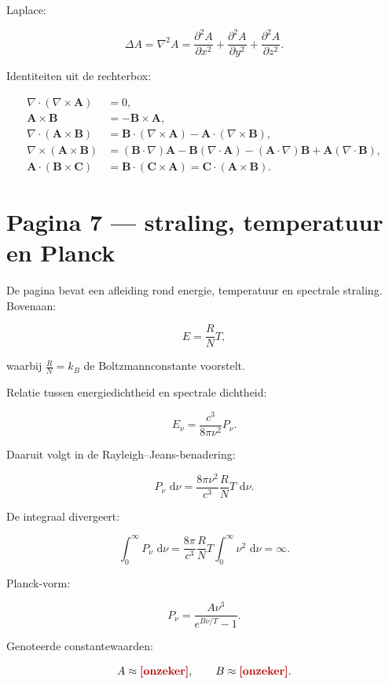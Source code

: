 \documentclass[11pt,a4paper]{article}
\newcommand{\onzeker}[1]{\ifmmode\text{\color{red!70!black}\bfseries[onzeker]}\else\textcolor{red!70!black}{\textbf{[onzeker:} #1\textbf{]}}\fi}
\newcommand{\vect}[1]{\mathbf{#1}}
\newcommand{\dd}{\,\mathrm{d}}
\begin{document}
Laplace:

$$
\Delta A
=
\nabla^2 A
=
\frac{\partial^2 A}{\partial x^2}
+
\frac{\partial^2 A}{\partial y^2}
+
\frac{\partial^2 A}{\partial z^2}.
$$

Identiteiten uit de rechterbox:

$$
\begin{aligned}
\nabla\cdot(\nabla\times\vect{A}) &= 0,\\
\vect{A}\times\vect{B} &= -\vect{B}\times\vect{A},\\
\nabla\cdot(\vect{A}\times\vect{B})
&=
\vect{B}\cdot(\nabla\times\vect{A})
-
\vect{A}\cdot(\nabla\times\vect{B}),\\
\nabla\times(\vect{A}\times\vect{B})
&=
(\vect{B}\cdot\nabla)\vect{A}
-\vect{B}(\nabla\cdot\vect{A})
-(\vect{A}\cdot\nabla)\vect{B}
+\vect{A}(\nabla\cdot\vect{B}),\\
\vect{A}\cdot(\vect{B}\times\vect{C})
&=
\vect{B}\cdot(\vect{C}\times\vect{A})
=
\vect{C}\cdot(\vect{A}\times\vect{B}).
\end{aligned}
$$

\newpage

\section*{Pagina 7 --- straling, temperatuur en Planck}
De pagina bevat een afleiding rond energie, temperatuur en spectrale straling. Bovenaan:

$$
E=\frac{R}{N}T,
$$

waarbij $\frac{R}{N}=k_B$ de Boltzmannconstante voorstelt.

Relatie tussen energiedichtheid en spectrale dichtheid:

$$
E_\nu
=
\frac{c^3}{8\pi\nu^2}P_\nu.
$$

Daaruit volgt in de Rayleigh--Jeans-benadering:

$$
P_\nu\,\dd \nu
=
\frac{8\pi\nu^2}{c^3}\frac{R}{N}T\,\dd \nu.
$$

De integraal divergeert:

$$
\int_0^\infty P_\nu\,\dd\nu
=
\frac{8\pi}{c^3}\frac{R}{N}T
\int_0^\infty \nu^2\,\dd\nu
=
\infty.
$$

Planck-vorm:

$$
P_\nu
=
\frac{A\nu^3}{e^{B\nu/T}-1}.
$$

Genoteerde constantewaarden:

$$
A \approx \onzeker{6.10\times10^{-36}},
\qquad
B \approx \onzeker{4.866\times10^{-11}}.
$$
\end{document}
